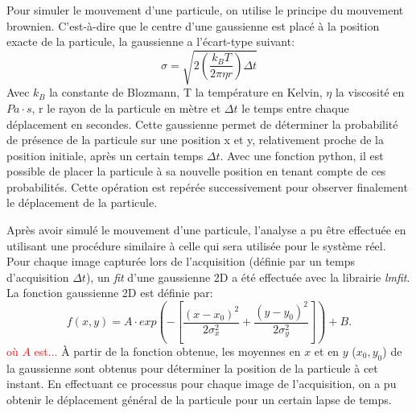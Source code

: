 \documentclass[conference]{IEEEtran}
\begin{document}
Pour simuler le mouvement d'une particule, on utilise le principe du mouvement brownien.
C'est-à-dire que le centre d'une gaussienne est placé à la position exacte de la particule,
la gaussienne a l'écart-type suivant:
\begin{equation}
  \sigma =\sqrt{2\left ( \frac{k_{B}T}{2\pi \eta r} \right )\Delta t}
\end{equation}
Avec $k_{B}$ la constante de Blozmann, T la température en Kelvin, $\eta$ la viscosité en $Pa\cdot s$, r le rayon de la particule en mètre et $\Delta t$ le temps entre chaque déplacement en secondes. 
Cette gaussienne permet de déterminer la probabilité de présence de la particule sur une position x et y, relativement proche de la position initiale, après un certain temps $\Delta t$.  Avec une fonction python, 
il est possible de placer la particule à sa nouvelle position en tenant compte de ces probabilités. Cette opération est repérée successivement pour observer finalement 
le déplacement de la particule. 

Après avoir simulé le mouvement d'une particule, l'analyse a pu être effectuée en utilisant une procédure similaire
à celle qui sera utilisée pour le système réel. Pour chaque image capturée lors de l'acquisition (définie par un temps d'acquisition $\Delta t$), un \textit{fit}
d'une gaussienne 2D a été effectuée avec la librairie \textit{lmfit}. La fonction gaussienne 2D est définie par:
\begin{equation}
  f(x,y)=A\cdot exp\left(-\left[\frac{(x-x_0)^2}{2\sigma_x^2}+\frac{(y-y_0)^2}{2\sigma_y^2}\right]\right)+B.
\end{equation}
\textcolor{red}{où $A$ est... }À partir de la fonction obtenue, les moyennes en $x$ et en $y$ ($x_0,y_0$) de la gaussienne sont obtenus
pour déterminer la position de la particule à cet instant. En effectuant ce processus pour chaque image de l'acquisition,
on a pu obtenir le déplacement général de la particule pour un certain lapse de temps.
\end{document}
